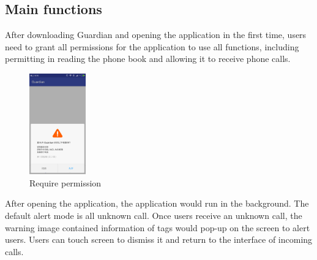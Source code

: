 \documentclass{article}
\begin{document}
    \subsection{Main functions}
    After downloading Guardian and opening the application in the first time, users need to grant all permissions for the application to use all functions, including permitting in reading the phone book and allowing it to receive phone calls.
    \begin{figure}[H]
        \centering
        \includegraphics[width=0.218\textwidth]{images/permission.jpg}
        \caption{Require permission}
        \label{image_permission}
    \end{figure}

    After opening the application, the application would run in the background.
    The default alert mode is all unknown call.
    Once users receive an unknown call, the warning image contained information of tags would pop-up on the screen to alert users.
    Users can touch screen to dismiss it and return to the interface of incoming calls.
\end{document}
